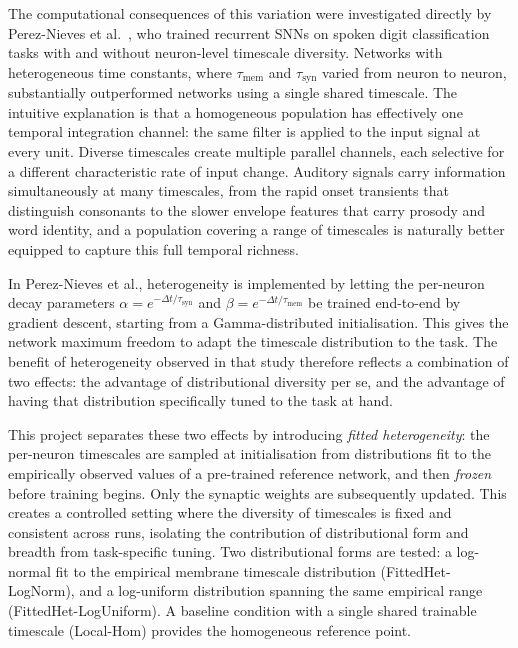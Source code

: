 \documentclass[12pt,twoside]{report}
\begin{document}
The computational consequences of this variation were investigated directly by 
Perez-Nieves et al.~\cite{pereznieves2021}, who trained recurrent SNNs on spoken 
digit classification tasks with and without neuron-level timescale diversity. Networks 
with heterogeneous time constants, where $\tau_\text{mem}$ and $\tau_\text{syn}$
varied from neuron to neuron, substantially outperformed networks using a single 
shared timescale. The intuitive explanation is that a homogeneous population has 
effectively one temporal integration channel: the same filter is applied to the input 
signal at every unit. Diverse timescales create multiple parallel channels, each 
selective for a different characteristic rate of input change. Auditory signals carry 
information simultaneously at many timescales, from the rapid onset transients that 
distinguish consonants to the slower envelope features that carry prosody and word 
identity, and a population covering a range of timescales is naturally better equipped 
to capture this full temporal richness.

In Perez-Nieves et al., heterogeneity is implemented by letting the per-neuron 
decay parameters $\alpha = e^{-\Delta t / \tau_\text{syn}}$ and 
$\beta = e^{-\Delta t / \tau_\text{mem}}$ be trained end-to-end by gradient descent, 
starting from a Gamma-distributed initialisation. This gives the network maximum 
freedom to adapt the timescale distribution to the task. The benefit of heterogeneity 
observed in that study therefore reflects a combination of two effects: the advantage 
of distributional diversity per se, and the advantage of having that distribution 
specifically tuned to the task at hand.

This project separates these two effects by introducing \emph{fitted heterogeneity}: 
the per-neuron timescales are sampled at initialisation from distributions fit to the 
empirically observed values of a pre-trained reference network, and then \emph{frozen} 
before training begins. Only the synaptic weights are subsequently updated. This creates 
a controlled setting where the diversity of timescales is fixed and consistent across 
runs, isolating the contribution of distributional form and breadth from task-specific 
tuning. Two distributional forms are tested: a log-normal fit to the empirical membrane 
timescale distribution (FittedHet-LogNorm), and a log-uniform distribution spanning the 
same empirical range (FittedHet-LogUniform). A baseline condition with a single shared 
trainable timescale (Local-Hom) provides the homogeneous reference point.
\end{document}
